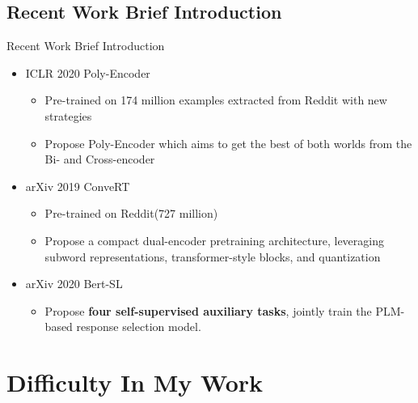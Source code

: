 \documentclass{beamer}
\begin{document}
\subsection{Recent Work Brief Introduction}
\begin{frame}{Recent Work Brief Introduction}
    \begin{itemize}
        \item ICLR 2020 Poly-Encoder
            \begin{itemize}
                \item Pre-trained on 174 million examples extracted from Reddit with new strategies
                \item Propose Poly-Encoder which aims to get the best of both worlds from the Bi- and Cross-encoder
            \end{itemize}
        \item arXiv 2019 ConveRT
        \begin{itemize}
            \item Pre-trained on Reddit(727 million)
            \item Propose a compact dual-encoder pretraining architecture, leveraging subword representations, transformer-style blocks, and quantization
        \end{itemize}
        \item arXiv 2020 Bert-SL
        \begin{itemize}
            \item Propose \textbf{four self-supervised auxiliary tasks}, jointly train the PLM-based response selection model.
        \end{itemize}
    \end{itemize}
\end{frame}

\section{Difficulty In My Work}



\end{document}
